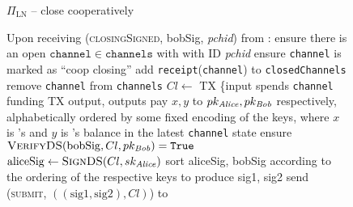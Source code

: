 \begin{figure}[H]
\begin{protocolbox}{$\Pi_{\mathrm{LN}}$ -- close cooperatively}
\begin{algorithmic}[1]
        \State Upon receiving (\textsc{closingSigned}, bobSig, \textit{pchid}) from
        \bob:
        \Indent
          \State ensure there is an open $\mathtt{channel} \in
          \mathtt{channels}$ with \bob with ID \textit{pchid}
          \label{alg:protocol:close:coop:signed:ensure:exists}
          \State ensure \texttt{channel} is marked as ``coop closing''
          \label{alg:protocol:close:coop:signed:ensure:marked}
          \State add \texttt{receipt}(\texttt{channel}) to
          \texttt{closedChannels}
          \label{alg:protocol:close:coop:report}
          \State remove \texttt{channel} from \texttt{channels}
          \State $Cl \gets$ TX \{input spends \texttt{channel} funding TX
          output, outputs pay $x, y$ to $pk_{\mathit{Alice}}, pk_{\mathit{Bob}}$ respectively,
          alphabetically ordered by some fixed encoding of the keys, where $x$
          is \alice's and $y$ is \bob's balance in the latest \texttt{channel}
          state
          \State ensure $\textsc{VerifyDS}(\mathrm{bobSig}, Cl, pk_{\mathit{Bob}}) =
          \mathtt{True}$
          \label{alg:protocol:close:coop:signed:ensure:sig}
          \State $\mathrm{aliceSig} \gets \textsc{SignDS}(Cl, sk_{\mathit{Alice}})$
          \State sort aliceSig, bobSig according to the ordering of the
          respective keys to produce sig1, sig2
          \State send (\textsc{submit}, $\left((\mathrm{sig1}, \mathrm{sig2}),
          Cl\right)$) to \ledger
        \EndIndent
      \end{algorithmic}
    \end{protocolbox}
    \caption{}
    \label{alg:protocol:close:coop}
  \end{figure}
